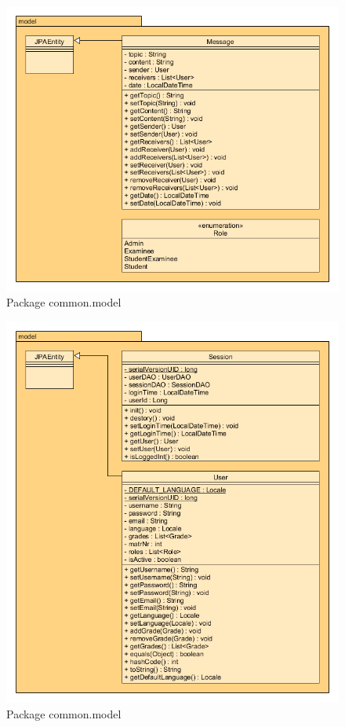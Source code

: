 \begin{figure}[H]
	\centering
  \includegraphics[width=\textwidth]{../UMLDiagramme/common/model/gfx/4_package_model_part_5.png}
	\caption{Package common.model}
\end{figure}

\begin{figure}[H]
	\centering
  \includegraphics[width=\textwidth]{../UMLDiagramme/common/model/gfx/4_package_model_part_6.png}
	\caption{Package common.model}
\end{figure}

